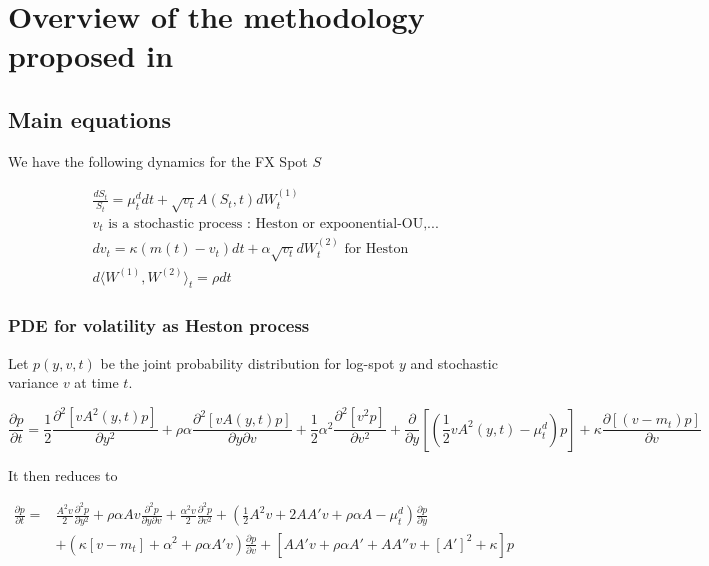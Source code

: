 \documentclass{article}
\begin{document}
\section{Overview of the methodology proposed in \cite{Clark2010}}
\subsection{Main equations}

We have the following dynamics for the FX Spot $S$

\begin{equation}
\begin{aligned}
	&\frac{dS_t}{S_t} = \mu^d_t dt + \sqrt{v_t} A(S_t,t) dW_t^{(1)}\\
	&v_t \text{ is a stochastic process : Heston or expoonential-OU,...}\\
	&dv_t = \kappa (m(t) - v_t) dt + \alpha \sqrt{v_t} dW_t^{(2)} \text{ for Heston}\\
	&d\langle W^{(1)}, W^{(2)} \rangle_t = \rho dt
\end{aligned}
\end{equation}


\subsubsection{PDE for volatility as Heston process}
Let $p(y,v,t)$ be the joint probability distribution for log-spot $y$ and stochastic variance $v$ at time $t$.

\begin{equation}
	\frac{\partial p}{\partial t} = \frac{1}{2} \frac{\partial^2 \left[vA^2(y,t)p\right]}{\partial y^2} + \rho \alpha \frac{\partial^2 \left[vA(y,t)p\right]}{\partial y \partial v} + \frac{1}{2} \alpha^2 \frac{\partial^2 \left[v^2 p \right]}{\partial v^2} + \frac{\partial }{\partial y} \left[\left(\frac{1}{2} vA^2(y,t) - \mu^d_t\right)p\right] + \kappa \frac{\partial \left[\left(v-m_t\right) p\right]}{\partial v}
\end{equation}

\noindent It then reduces to 

\begin{equation}
\label{eq:SLV}
\begin{aligned}
	\frac{\partial p}{\partial t} =
 &\frac{A^2v}{2}\frac{\partial^2 p}{\partial y^2}
 + \rho \alpha A v \frac{\partial^2 p}{\partial y \partial v} 
+ \frac{\alpha^2 v}{2} \frac{\partial^2 p}{\partial v^2} 
+ \left(\frac{1}{2} A^2 v + 2 A A' v + \rho \alpha A - \mu^d_t\right)\frac{\partial p}{\partial y}\\
& + \left(\kappa \left[v - m_t\right] + \alpha^2 + \rho \alpha A' v\right) \frac{\partial p}{\partial v}
+\left[ AA'v + \rho \alpha A' + AA''v + \left[A'\right]^2 + \kappa\right] p
\end{aligned}
\end{equation}
\end{document}
